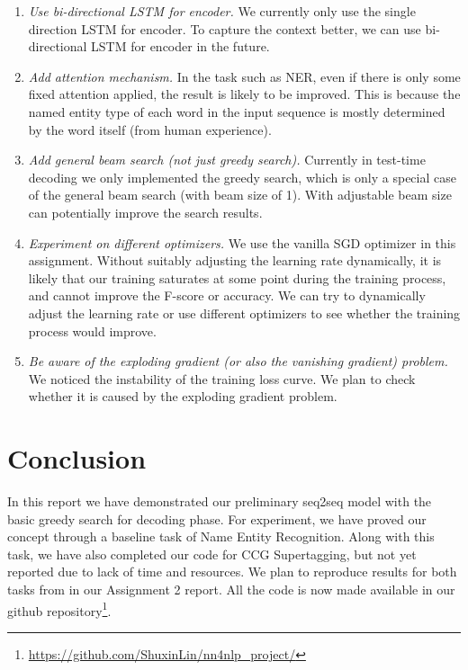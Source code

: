 \documentclass[11pt,a4paper]{article}
\begin{document}
\begin{enumerate}
	\item \emph{Use bi-directional LSTM for encoder.} We currently only use the single direction LSTM for encoder. To capture the context better, we can use bi-directional LSTM for encoder in the future.
    \item \emph{Add attention mechanism.} In the task such as NER, even if there is only some fixed attention applied, the result is likely to be improved. This is because the named entity type of each word in the input sequence is mostly determined by the word itself (from human experience).
    \item \emph{Add general beam search (not just greedy search).} Currently in test-time decoding we only implemented the greedy search, which is only a special case of the general beam search (with beam size of 1). With adjustable beam size can potentially improve the search results.
    \item \emph{Experiment on different optimizers.} We use the vanilla SGD optimizer in this assignment. Without suitably adjusting the learning rate dynamically, it is likely that our training saturates at some point during the training process, and cannot improve the F-score or accuracy. We can try to dynamically adjust the learning rate or use different optimizers to see whether the training process would improve.
    \item \emph{Be aware of the exploding gradient (or also the vanishing gradient) problem.} We noticed the instability of the training loss curve. We plan to check whether it is caused by the exploding gradient problem.
\end{enumerate}


\section{Conclusion} \label{sec:conclusion}
In this report we have demonstrated our preliminary seq2seq model with the basic greedy search for decoding phase. For experiment, we have proved our concept through a baseline task of Name Entity Recognition. Along with this task, we have also completed our code for CCG Supertagging, but not yet reported due to lack of time and resources. We plan to reproduce results for both tasks from \citet{goyal2018continuous} in our Assignment 2 report. All the code is now made available in our github repository\footnote{\url{https://github.com/ShuxinLin/nn4nlp_project/}}. 
\end{document}
